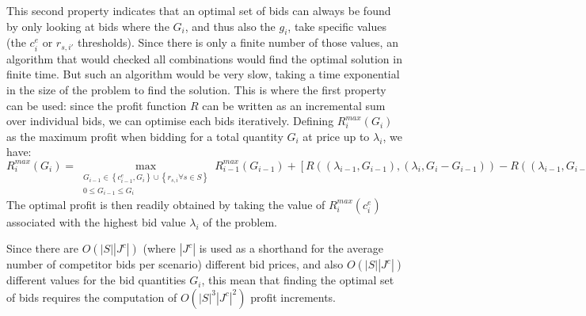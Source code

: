 \documentclass[12pt]{article}
\begin{document}
This second property indicates that an optimal set of bids can always be
found by only looking at bids where the $G_i$, and thus also the $g_i$,
take specific values (the $c^e_i$ or $r_{s,i'}$ thresholds). Since there is
only a finite number of those values, an algorithm that would checked
all combinations would find the optimal solution in finite time. But such
an algorithm would be very slow, taking a time exponential in the size
of the problem to find the solution. This is where the first property can
be used: since the profit function $R$ can be written as an incremental
sum over individual bids, we can optimise each bids iteratively.
Defining $R^{max}_i(G_i)$ as the maximum profit when bidding for a total
quantity $G_i$ at price up to $\lambda_i$, we have:
\begin{equation}
R^{max}_i(G_i) = \max_{\substack{G_{i-1} \in \left\{ c^e_{i-1}, G_i \right\}
\cup \left\{ r_{s,i} \forall s \in S \right\}
\\ 0 \le G_{i-1} \le G_i}}
R^{max}_{i-1}(G_{i-1}) +
\left[  R\left( (\lambda_{i-1}, G_{i-1}), (\lambda_i, G_i - G_{i-1}) \right) -
R\left( (\lambda_{i-1}, G_{i-1}) \right) \right].
\end{equation}
The optimal profit is then readily obtained by taking the value of
$R^{max}_i(c^e_i)$ associated with the highest bid value $\lambda_i$ of
the problem.

Since there are $O(|S| |J^c|)$ (where $|J^c|$ is used as a shorthand for
the average number of competitor bids per scenario) different bid prices,
and also $O(|S| |J^c|)$ different values for the bid quantities $G_i$,
this mean that finding the optimal set of bids requires the
computation of $O(|S|^3 |J^c|^2)$ profit increments.
\end{document}
